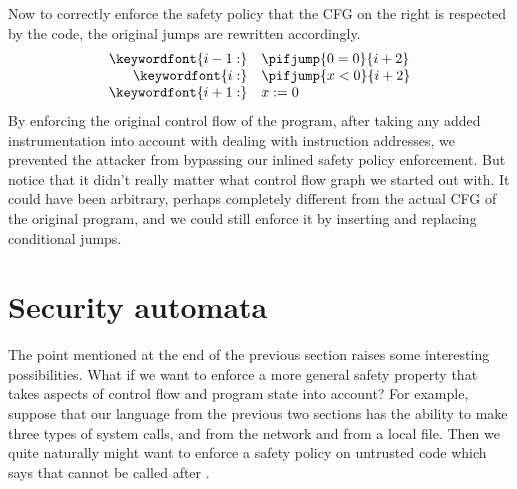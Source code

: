 \documentclass[11pt,twoside]{scrartcl}
\begin{document}
Now to correctly enforce the safety policy that the CFG on the right is respected by the code, the original jumps are rewritten accordingly.
\[
\begin{array}{rl}
\keywordfont{i-1:} & \pifjump{0=0}{i+2} \\
\keywordfont{i:} & \pifjump{x < 0}{i+2} \\
\keywordfont{i+1:} & x := 0
\end{array}
\]
By enforcing the original control flow of the program, after taking any added instrumentation into account with dealing with instruction addresses, we prevented the attacker from bypassing our inlined safety policy enforcement. But notice that it didn't really matter what control flow graph we started out with. It could have been arbitrary, perhaps completely different from the actual CFG of the original program, and we could still enforce it by inserting and replacing conditional jumps.

\section{Security automata}

The point mentioned at the end of the previous section raises some interesting possibilities. What if we want to enforce a more general safety property that takes aspects of control flow and program state into account? For example, suppose that our language from the previous two sections has the ability to make three types of system calls, \psend and \precv from the network and \pread from a local file. Then we quite naturally might want to enforce a safety policy on untrusted code which says that \psend cannot be called after \pread.
\end{document}

